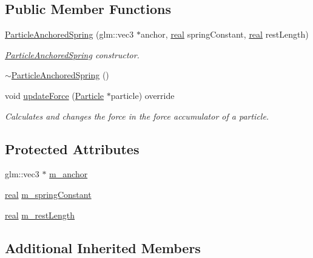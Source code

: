 \subsection*{Public Member Functions}
\begin{DoxyCompactItemize}
\item 
\mbox{\hyperlink{classr3_1_1_particle_anchored_spring_adc141455ffbe50ec1595679cc3fe9753}{Particle\+Anchored\+Spring}} (glm\+::vec3 $\ast$anchor, \mbox{\hyperlink{namespacer3_ab2016b3e3f743fb735afce242f0dc1eb}{real}} spring\+Constant, \mbox{\hyperlink{namespacer3_ab2016b3e3f743fb735afce242f0dc1eb}{real}} rest\+Length)
\begin{DoxyCompactList}\small\item\em \mbox{\hyperlink{classr3_1_1_particle_anchored_spring}{Particle\+Anchored\+Spring}} constructor. \end{DoxyCompactList}\item 
\mbox{\hyperlink{classr3_1_1_particle_anchored_spring_ab82659ed05c6dc0e3a60a68fa50d3f3e}{$\sim$\+Particle\+Anchored\+Spring}} ()
\item 
void \mbox{\hyperlink{classr3_1_1_particle_anchored_spring_a8c5690a32a5061582989d5915a84cff8}{update\+Force}} (\mbox{\hyperlink{classr3_1_1_particle}{Particle}} $\ast$particle) override
\begin{DoxyCompactList}\small\item\em Calculates and changes the force in the force accumulator of a particle. \end{DoxyCompactList}\end{DoxyCompactItemize}
\subsection*{Protected Attributes}
\begin{DoxyCompactItemize}
\item 
glm\+::vec3 $\ast$ \mbox{\hyperlink{classr3_1_1_particle_anchored_spring_a7ada060d890b9287f3cbc78f125753e7}{m\+\_\+anchor}}
\item 
\mbox{\hyperlink{namespacer3_ab2016b3e3f743fb735afce242f0dc1eb}{real}} \mbox{\hyperlink{classr3_1_1_particle_anchored_spring_a0c220ca894297faeb2ea7b97dea9c27e}{m\+\_\+spring\+Constant}}
\item 
\mbox{\hyperlink{namespacer3_ab2016b3e3f743fb735afce242f0dc1eb}{real}} \mbox{\hyperlink{classr3_1_1_particle_anchored_spring_a9440aa0062da7c4030810c3ae0006393}{m\+\_\+rest\+Length}}
\end{DoxyCompactItemize}
\subsection*{Additional Inherited Members}


